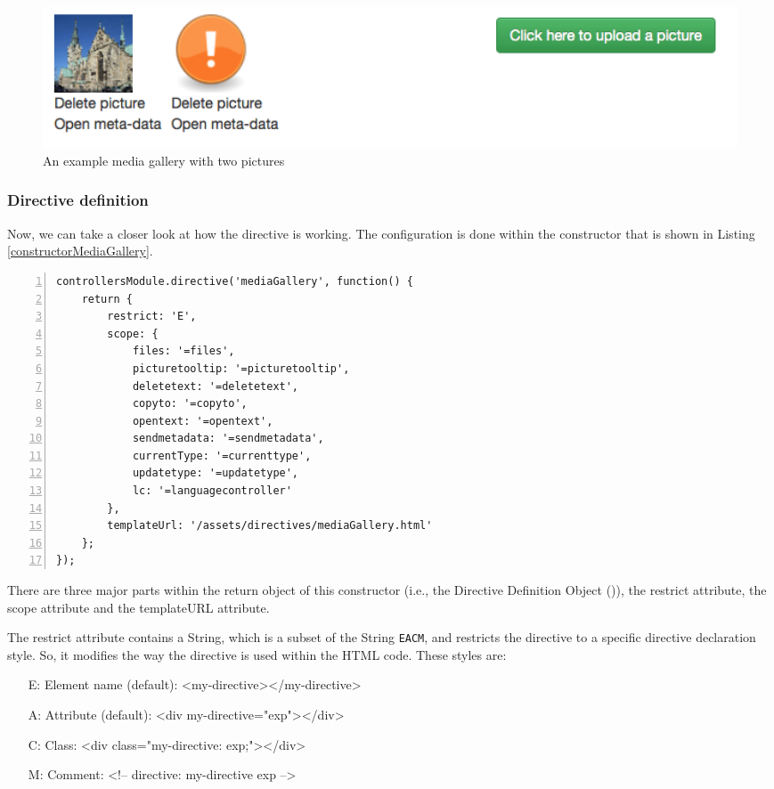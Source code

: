 \begin{figure}[th]
\centerline{\includegraphics[width=1\textwidth]{gfx/mediaGallery}}
\caption{An example media gallery with two pictures}
\label{mediaGallery}
\end{figure}

\subsubsection{Directive definition}
Now, we can take a closer look at how the directive is working. The configuration is done within the constructor that is shown in Listing \ref{constructorMediaGallery}.

\begin{lstlisting}[numbers=left,caption={The listing shows the initialisation of the media gallery directive},label=constructorMediaGallery,frame=tlbr,breaklines]
controllersModule.directive('mediaGallery', function() {
    return {
        restrict: 'E',
        scope: {
            files: '=files',
            picturetooltip: '=picturetooltip',
            deletetext: '=deletetext',
            copyto: '=copyto',
            opentext: '=opentext',
            sendmetadata: '=sendmetadata',
            currentType: '=currenttype',
            updatetype: '=updatetype',
            lc: '=languagecontroller'
        },
        templateUrl: '/assets/directives/mediaGallery.html'
    };
});
\end{lstlisting}

There are three major parts within the return object of this constructor (i.e., the Directive Definition Object (\cite{AngularCons})), the restrict attribute, the scope attribute and the templateURL attribute. 

The restrict attribute contains a String, which is a subset of the String \verb|EACM|, and restricts the directive to a specific directive declaration style. So, it modifies the way the directive is used within the \ac{HTML} code. These styles are:

\begin{itemize}
\item[E:] Element name (default): <my-directive></my-directive>
\item[A:] Attribute (default): <div my-directive="exp"></div>
\item[C:] Class: <div class="my-directive: exp;"></div>
\item[M:] Comment: <!-- directive: my-directive exp -->
\end{itemize}

